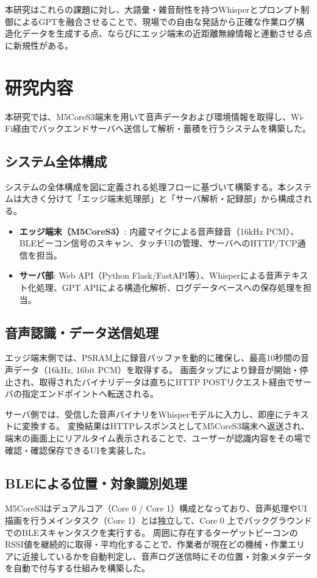 \documentclass[a4paper,12pt,ja=standard,lualatex]{bxjsarticle}
\begin{document}
本研究はこれらの課題に対し、大語彙・雑音耐性を持つWhisperとプロンプト制御によるGPTを融合させることで、現場での自由な発話から正確な作業ログ構造化データを生成する点、ならびにエッジ端末の近距離無線情報と連動させる点に新規性がある。

\newpage

\section{研究内容}\label{sec3}
本研究では、M5CoreS3端末を用いて音声データおよび環境情報を取得し、Wi-Fi経由でバックエンドサーバへ送信して解析・蓄積を行うシステムを構築した。

\subsection{システム全体構成}
システムの全体構成を図に定義される処理フローに基づいて構築する。本システムは大きく分けて「エッジ端末処理部」と「サーバ解析・記録部」から構成される。

\begin{itemize}
    \item \textbf{エッジ端末（M5CoreS3）}: 内蔵マイクによる音声録音（16kHz PCM）、BLEビーコン信号のスキャン、タッチUIの管理、サーバへのHTTP/TCP通信を担当。
    \item \textbf{サーバ部}: Web API（Python Flask/FastAPI等）、Whisperによる音声テキスト化処理、GPT APIによる構造化解析、ログデータベースへの保存処理を担当。
\end{itemize}

\subsection{音声認識・データ送信処理}
エッジ端末側では、PSRAM上に録音バッファを動的に確保し、最高10秒間の音声データ（16kHz, 16bit PCM）を取得する。
画面タップにより録音が開始・停止され、取得されたバイナリデータは直ちにHTTP POSTリクエスト経由でサーバの指定エンドポイントへ転送される。

サーバ側では、受信した音声バイナリをWhisperモデルに入力し、即座にテキストに変換する。
変換結果はHTTPレスポンスとしてM5CoreS3端末へ返送され、端末の画面上にリアルタイム表示されることで、ユーザーが認識内容をその場で確認・確認保存できるUIを実装した。

\subsection{BLEによる位置・対象識別処理}
M5CoreS3はデュアルコア（Core 0 / Core 1）構成となっており、音声処理やUI描画を行うメインタスク（Core 1）とは独立して、Core 0 上でバックグラウンドでのBLEスキャンタスクを実行する。
周囲に存在するターゲットビーコンのRSSI値を継続的に取得・平均化することで、作業者が現在どの機械・作業エリアに近接しているかを自動判定し、音声ログ送信時にその位置・対象メタデータを自動で付与する仕組みを構築した。
\end{document}

